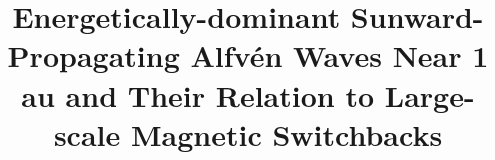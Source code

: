 \documentclass[twocolumn, times]{aastex631}
\begin{document}
\title{Energetically-dominant Sunward-Propagating Alfv\'en Waves Near 1 au and Their Relation to Large-scale Magnetic Switchbacks}


\end{document}
